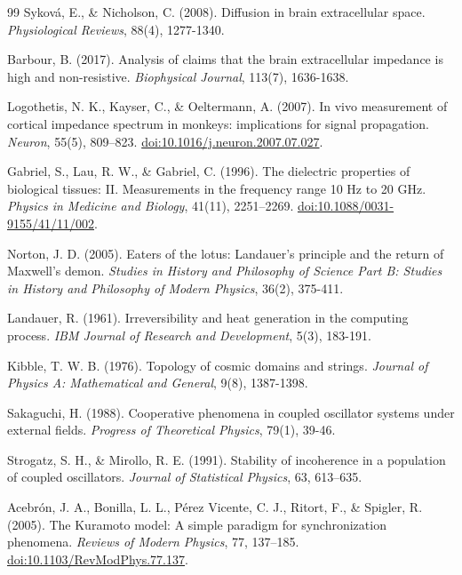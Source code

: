 \begin{thebibliography}{99}
 Sykov\'{a}, E., \& Nicholson, C. (2008). Diffusion in brain extracellular space. \textit{Physiological Reviews}, 88(4), 1277-1340.

 Barbour, B. (2017). Analysis of claims that the brain extracellular impedance is high and non-resistive. \textit{Biophysical Journal}, 113(7), 1636-1638.

 Logothetis, N. K., Kayser, C., \& Oeltermann, A. (2007). In vivo measurement of cortical impedance spectrum in monkeys: implications for signal propagation. \textit{Neuron}, 55(5), 809--823. \href{https://doi.org/10.1016/j.neuron.2007.07.027}{doi:10.1016/j.neuron.2007.07.027}.

 Gabriel, S., Lau, R. W., \& Gabriel, C. (1996). The dielectric properties of biological tissues: II. Measurements in the frequency range 10 Hz to 20 GHz. \textit{Physics in Medicine and Biology}, 41(11), 2251--2269. \href{https://doi.org/10.1088/0031-9155/41/11/002}{doi:10.1088/0031-9155/41/11/002}.

 Norton, J. D. (2005). Eaters of the lotus: Landauer's principle and the return of Maxwell's demon. \textit{Studies in History and Philosophy of Science Part B: Studies in History and Philosophy of Modern Physics}, 36(2), 375-411.

 Landauer, R. (1961). Irreversibility and heat generation in the computing process. \textit{IBM Journal of Research and Development}, 5(3), 183-191.

 Kibble, T. W. B. (1976). Topology of cosmic domains and strings. \textit{Journal of Physics A: Mathematical and General}, 9(8), 1387-1398.

 Sakaguchi, H. (1988). Cooperative phenomena in coupled oscillator systems under external fields. \textit{Progress of Theoretical Physics}, 79(1), 39-46.

 Strogatz, S. H., \& Mirollo, R. E. (1991). Stability of incoherence in a population of coupled oscillators. \textit{Journal of Statistical Physics}, 63, 613--635.

 Acebr\'{o}n, J. A., Bonilla, L. L., P\'{e}rez Vicente, C. J., Ritort, F., \& Spigler, R. (2005). The Kuramoto model: A simple paradigm for synchronization phenomena. \textit{Reviews of Modern Physics}, 77, 137--185. \href{https://doi.org/10.1103/RevModPhys.77.137}{doi:10.1103/RevModPhys.77.137}.


\end{thebibliography}
